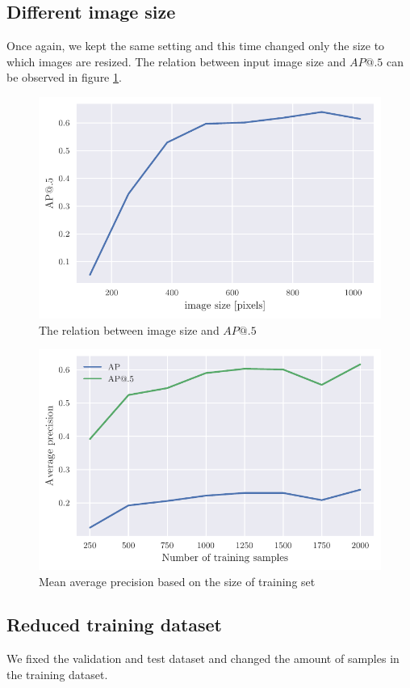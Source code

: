\subsection{Different image size}
Once again, we kept the same setting and this time changed only the size to which images are resized. The relation between input image size and $AP@.5$ can be observed in figure \ref{fig:img_sizes}.

\begin{paracol}{2}
    \begin{figure}
        \centering
        \includegraphics[width=0.99\linewidth]{images/img_size_dependency.pdf}
        \caption{The relation between image size and $AP@.5$}
        \label{fig:img_sizes}
    \end{figure}
    \switchcolumn
    \begin{figure}
        \centering
        \includegraphics[width=0.99\linewidth]{images/training_set_dependency.pdf}
        \caption{Mean average precision based on the size of training set}
        \label{fig:training_set_sizes}
    \end{figure}
\end{paracol}

\subsection{Reduced training dataset}
We fixed the validation and test dataset and changed the amount of samples in the training dataset.

